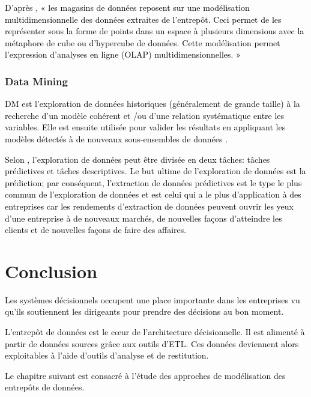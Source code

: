\documentclass[a4paper,12pt]{report}
\begin{document}
\textcolor{black}{D’après \citep{tournier2007analyse}, « les magasins de données reposent sur une modélisation multidimensionnelle des données extraites de l’entrepôt. Ceci permet de les représenter sous la forme de points dans un espace à plusieurs dimensions avec la métaphore de cube ou d’hypercube de données. Cette modélisation permet l’expression d’analyses en ligne (OLAP) multidimensionnelles. »}
\subsubsection{Data Mining}
\textcolor{black}{DM est l'exploration de données historiques (généralement de grande taille) à la recherche d'un modèle cohérent et /ou d'une relation systématique entre les variables. Elle est ensuite utilisée pour valider les résultats en appliquant les modèles détectés à de nouveaux sous-ensembles de données \citep{berry2000mastering}.}

\textcolor{black}{Selon \citep{fayyad1996advances}, l'exploration de données peut être divisée en deux tâches: tâches prédictives et tâches descriptives. Le but ultime de l'exploration de données est la prédiction; par conséquent, l'extraction de données prédictives est le type le plus commun de l'exploration de données et est celui qui a le plus d'application à des entreprises car les rendements d'extraction de données  peuvent ouvrir les yeux d'une entreprise à de nouveaux marchés, de nouvelles façons d'atteindre les clients et de nouvelles façons de faire des affaires. }

\section*{Conclusion}
\textcolor{black}{Les systèmes décisionnels occupent une place importante dans les entreprises vu qu’ils soutiennent les dirigeants pour prendre des décisions au bon moment.} 

\textcolor{black}{L’entrepôt de données est le cœur de l’architecture décisionnelle.  Il est alimenté à partir de données sources grâce aux outils d’ETL. Ces données deviennent alors exploitables à l’aide d’outils d’analyse et de restitution.}

\textcolor{black}{Le chapitre suivant est consacré à l’étude des approches de modélisation des entrepôts de données.}
\end{document}

